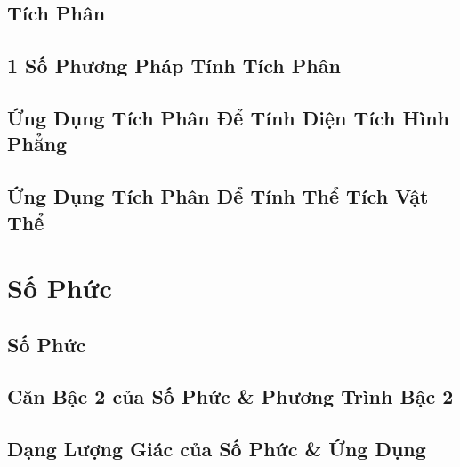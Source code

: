 \documentclass[oneside]{book}
\numberwithin{equation}{section}
\begin{document}

\section{Tích Phân}


\section{1 Số Phương Pháp Tính Tích Phân}


\section{Ứng Dụng Tích Phân Để Tính Diện Tích Hình Phẳng}


\section{Ứng Dụng Tích Phân Để Tính Thể Tích Vật Thể}


\chapter{Số Phức}

\section{Số Phức}


\section{Căn Bậc 2 của Số Phức \& Phương Trình Bậc 2}


\section{Dạng Lượng Giác của Số Phức \& Ứng Dụng}
\end{document}
